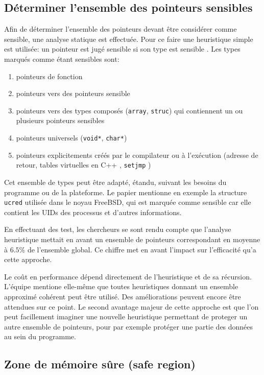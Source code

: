 \subsection{Déterminer l'ensemble des pointeurs sensibles}

Afin de déterminer l'ensemble des pointeurs devant être considérer comme sensible, une analyse statique est effectuée. Pour ce faire une heuristique simple est utilisée: \og un pointeur est jugé sensible si son type est sensible \fg. Les types marqués comme étant sensibles sont:

\begin{enumerate}
	\item pointeurs de fonction
	\item pointeurs vers des pointeurs sensible
	\item pointeurs vers des types composés (\texttt{array}, \texttt{struc}) qui contiennent un ou plusieurs pointeurs sensibles
	\item pointeurs universels (\texttt{void*}, \texttt{char*})
  \item pointeurs explicitements créés par le compilateur ou à l'exécution (adresse de retour, tables virtuelles en C++ \cite{fonctionsVirtuelles}, \texttt{setjmp} \cite{setjmp})
\end{enumerate}

Cet ensemble de types peut être adapté, étandu, suivant les besoins du programme ou de la plateforme. Le papier mentionne en exemple la structure \texttt{ucred} utilisée dans le noyau FreeBSD, qui est marquée comme sensible car elle contient les UIDs des processus et d'autres informations.

En effectuant des test, les chercheurs se sont rendu compte que l'analyse heuristique mettait en avant un ensemble de pointeurs correspondant en moyenne à $6.5\%$ de l'ensemble global. Ce chiffre met en avant l'impact sur l'efficacité qu'a cette approche.

Le coût en performance dépend directement de l'heuristique et de sa récursion. L'équipe mentione elle-même que toutes heuristiques donnant un ensemble approximé cohérent peut être utilisé. Des améliorations peuvent encore être attendues sur ce point. Le second avantage majeur de cette approche est que l'on peut facillement imaginer une nouvelle heuristique permettant de proteger un autre ensemble de pointeurs, pour par exemple protéger une partie des données au sein du programme.

\subsection{Zone de mémoire sûre (safe region)}

